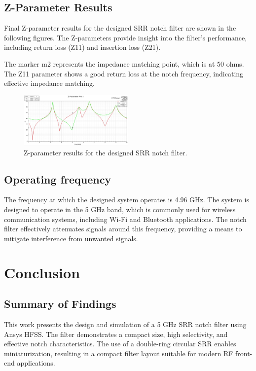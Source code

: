 \documentclass[conference]{IEEEtran}
\begin{document}
\subsection{Z-Parameter Results}

Final Z-parameter results for the designed SRR notch filter are shown in the following figures. The Z-parameters provide insight into the filter's performance, including return loss (Z11) and insertion loss (Z21).

The marker m2 represents the impedance matching point, which is at 50 ohms. The Z11 parameter shows a good return loss at the notch frequency, indicating effective impedance matching. 

\begin{figure}
\centering
    \includegraphics[width=0.5\textwidth]{Images/Final_Z_Param_Plot.jpg}
    \caption{Z-parameter results for the designed SRR notch filter.}
\end{figure}

\subsection{Operating frequency}
The frequency at which the designed system operates is 4.96 GHz. The system is designed to operate in the 5 GHz band, which is commonly used for wireless communication systems, including Wi-Fi and Bluetooth applications. The notch filter effectively attenuates signals around this frequency, providing a means to mitigate interference from unwanted signals.

\section{Conclusion}
\subsection{Summary of Findings}
This work presents the design and simulation of a 5 GHz SRR notch filter using Ansys HFSS. The filter demonstrates a compact size, high selectivity, and effective notch characteristics. The use of a double-ring circular SRR enables miniaturization, resulting in a compact filter layout suitable for modern RF front-end applications.
\end{document}
